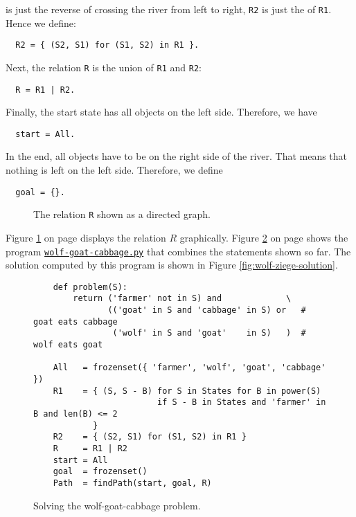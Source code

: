 is just the reverse of crossing the river from left to right, \texttt{R2} is just the  of
\texttt{R1}.   Hence we define:
\begin{verbatim}
  R2 = { (S2, S1) for (S1, S2) in R1 }.
\end{verbatim}
Next, the relation \texttt{R} is the union of \texttt{R1} and \texttt{R2}:
\begin{verbatim}
  R = R1 | R2.
\end{verbatim}
Finally, the start state has all objects on the left side.  Therefore, we have
\begin{verbatim}
  start = All.
\end{verbatim}
In the end, all objects have to be on the right side of the river.  That means that nothing is left
on the left side.  Therefore, we define
\begin{verbatim}
  goal = {}.
\end{verbatim}


\begin{figure}[h]
  \centering


  \caption{The relation \texttt{R} shown as a directed graph.}
  \label{fig:wolf-goat-cabbage.pdf}
\end{figure}



\noindent
Figure \ref{fig:wolf-goat-cabbage.pdf} on page \pageref{fig:wolf-goat-cabbage.pdf} displays the relation $R$ graphically.
Figure \ref{fig:wolf-ziege} on page \pageref{fig:wolf-ziege} shows the program
\href{https://github.com/karlstroetmann/Logic/blob/master/Python/wolf-goat-cabbage.py}{\texttt{wolf-goat-cabbage.py}}
that combines the statements shown so far.  The solution computed by this program is shown in Figure
 \ref{fig:wolf-ziege-solution}.

\begin{figure}[!ht]
  \centering
\begin{verbatim}
    def problem(S):
        return ('farmer' not in S) and             \
               (('goat' in S and 'cabbage' in S) or   # goat eats cabbage
                ('wolf' in S and 'goat'    in S)   )  # wolf eats goat
    
    All   = frozenset({ 'farmer', 'wolf', 'goat', 'cabbage' })
    R1    = { (S, S - B) for S in States for B in power(S)
                         if S - B in States and 'farmer' in B and len(B) <= 2
            }
    R2    = { (S2, S1) for (S1, S2) in R1 }
    R     = R1 | R2
    start = All
    goal  = frozenset()
    Path  = findPath(start, goal, R)
\end{verbatim} 
\vspace*{-0.3cm}
\caption{Solving the wolf-goat-cabbage problem.}  
\label{fig:wolf-ziege}
\end{figure}


